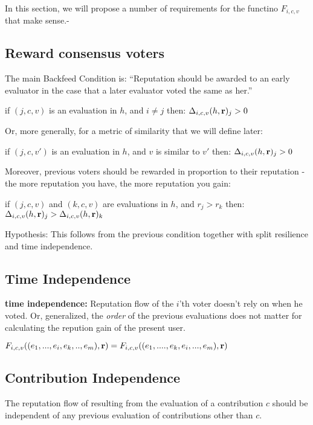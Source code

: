\documentclass{article}
\begin{document}
In this section, we will propose a number of requirements for the functino $F_{i, c, v}$ that make sense.-

\subsection{Reward consensus voters}

The main Backfeed Condition is:
``Reputation should be awarded to an early evaluator in the case that a later evaluator voted the same as her.''
\begin{center}
if $(j, c, v)$ is an evaluation in $h$, and $i \neq j$ then:
$\Delta_{i, c, v}(h, {\bf r})_j > 0$
\end{center}
Or, more generally, for a metric of similarity that we will define later:
\begin{center}
if $(j, c, v')$ is an evaluation in $h$, and $v$ is similar to $v'$ then:
$\Delta_{i, c, v}(h, {\bf r})_j > 0$
\end{center}
Moreover, previous voters should be rewarded in proportion to their reputation - the more reputation you have, the more reputation you gain:
\begin{center}
if $(j, c, v)$  and $(k, c, v)$ are evaluations in $h$, and $r_j >r_k$ then:
$\Delta_{i, c, v}(h, {\bf r})_j > \Delta_{i,c,v}(h, {\bf r})_k$
\end{center}
Hypothesis: This follows from the previous condition together with split resilience and time independence.


\subsection{Time Independence}

{\bf time independence:} Reputation flow of the $i$’th voter doesn’t rely on when he voted. Or, generalized, the {\em order} of the previous evaluations does not matter for calculating the repution gain of the present user.
\begin{center}
$F_{i,c,v}((e_1, ..., e_i, e_k, .. , e_m), {\bf r}) = F_{i,c,v}((e_1, ...., e_k, e_i, ... , e_m), {\bf r})$
\end{center}

\subsection{Contribution Independence}

The reputation flow of resulting from the evaluation of a contribution $c$ should be independent of any previous evaluation of contributions other than $c$.
\end{document}
